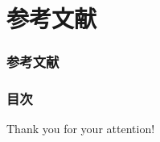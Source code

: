 \section*{参考文献}
\begin{frame}
  \frametitle{参考文献}

  
  \nocite{*}
  
\end{frame}

\begin{frame}
  \frametitle{目次}

  \tableofcontents
\end{frame}

\begin{frame}
  \centering
  {\Huge Thank you for your attention!}
\end{frame}


